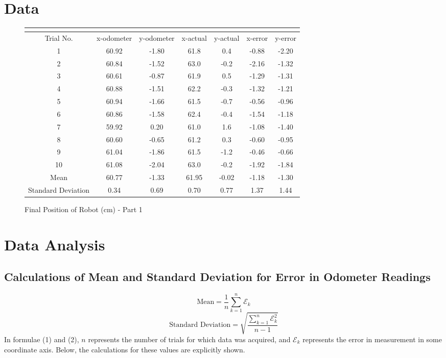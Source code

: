 \documentclass[11pt]{article}
\begin{document}
\section{Data}
\begin{figure}[h!t]
\begin{center}
\caption{Final Position of Robot (cm) - Part 1}
\begin{tabular}{| c | c | c | c | c | c | c |}
\multicolumn{4}{c}{} \\ \hline
Trial No. & x-odometer & y-odometer & x-actual & y-actual & x-error & y-error\\ \hline
1 & 60.92 & -1.80 & 61.8 & 0.4 & -0.88 & -2.20 \\ \hline
2 & 60.84 & -1.52 & 63.0 & -0.2 & -2.16 & -1.32 \\ \hline
3 & 60.61 & -0.87 & 61.9 & 0.5 & -1.29 & -1.31 \\ \hline
4 & 60.88 & -1.51 & 62.2 & -0.3 & -1.32 & -1.21 \\ \hline
5 & 60.94 & -1.66 & 61.5 & -0.7 & -0.56 & -0.96 \\ \hline
6 & 60.86 & -1.58 & 62.4 & -0.4 & -1.54 & -1.18 \\ \hline
7 & 59.92 & 0.20 & 61.0 & 1.6 & -1.08 & -1.40 \\ \hline
8 & 60.60 & -0.65 & 61.2 & 0.3 & -0.60 & -0.95 \\ \hline
9 & 61.04 & -1.86 & 61.5 & -1.2 & -0.46 & -0.66 \\ \hline
10 & 61.08 & -2.04 & 63.0 & -0.2 & -1.92 & -1.84 \\ \hline
Mean & 60.77 & -1.33 & 61.95 & -0.02 & -1.18 & -1.30 \\ \hline
Standard Deviation & 0.34 & 0.69 & 0.70 & 0.77 & 1.37 & 1.44 \\ \hline
\end{tabular}
\end{center}
\end{figure}
\section{Data Analysis}
\subsection{Calculations of Mean and Standard Deviation for Error in Odometer Readings}
\begin{equation}
	\mbox{Mean} = \frac{1}{n} \sum_{k=1}^{n}\mathcal{E}_k
\end{equation}
\begin{equation}
	\mbox{Standard Deviation} = \sqrt{\frac{\sum_{k=1}^{n}\mathcal{E}^2_k}{n-1}}
\end{equation}
In formulae (1) and (2), $n$ represents the number of trials for which data was acquired, and
$\mathcal{E}_k$ represents the error in measurement in some coordinate axis. Below, the calculations
for these values are explicitly shown.
\end{document}
